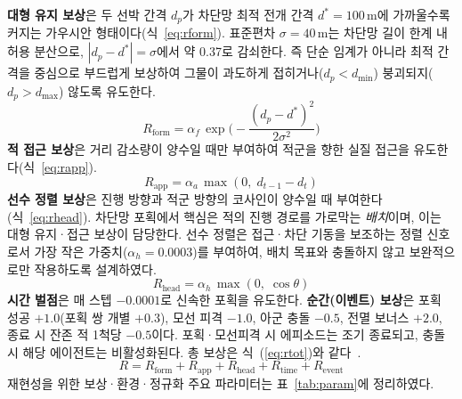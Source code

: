 \documentclass[9pt,twocolumn,a4paper]{extarticle}
\begin{document}
\textbf{대형 유지 보상}은 두 선박 간격 $d_p$가 차단망 최적 전개 간격 $d^{*}=100$\,m에 가까울수록 커지는
가우시안 형태이다(식~\ref{eq:rform}). 표준편차 $\sigma=40$\,m는 차단망 길이 한계 내 허용 분산으로,
$|d_p-d^{*}|=\sigma$에서 약 0.37로 감쇠한다. 즉 단순 임계가 아니라 최적 간격을 중심으로 부드럽게 보상하여
그물이 과도하게 접히거나($d_p<d_{\min}$) 붕괴되지($d_p>d_{\max}$) 않도록 유도한다.
\begin{equation}\label{eq:rform}
R_{\text{form}}=\alpha_f\,\exp\!\Big(-\frac{(d_p-d^{*})^2}{2\sigma^2}\Big)
\end{equation}
\textbf{적 접근 보상}은 거리 감소량이 양수일 때만 부여하여 적군을 향한 실질 접근을 유도한다(식~\ref{eq:rapp}).
\begin{equation}\label{eq:rapp}
R_{\text{app}}=\alpha_a\,\max(0,\; d_{t-1}-d_t)
\end{equation}
\textbf{선수 정렬 보상}은 진행 방향과 적군 방향의 코사인이 양수일 때 부여한다(식~\ref{eq:rhead}). 차단망 포획에서
핵심은 적의 진행 경로를 가로막는 \emph{배치}이며, 이는 대형 유지·접근 보상이 담당한다. 선수 정렬은 접근·차단
기동을 보조하는 정렬 신호로서 가장 작은 가중치($\alpha_h=0.0003$)를 부여하여, 배치 목표와 충돌하지 않고
보완적으로만 작용하도록 설계하였다.
\begin{equation}\label{eq:rhead}
R_{\text{head}}=\alpha_h\,\max(0,\;\cos\theta)
\end{equation}
\textbf{시간 벌점}은 매 스텝 $-0.0001$로 신속한 포획을 유도한다. \textbf{순간(이벤트) 보상}은 포획 성공
$+1.0$(포획 쌍 개별 $+0.3$), 모선 피격 $-1.0$, 아군 충돌 $-0.5$, 전멸 보너스 $+2.0$, 종료 시 잔존 적
1척당 $-0.5$이다. 포획·모선피격 시 에피소드는 조기 종료되고, 충돌 시 해당 에이전트는 비활성화된다. 총 보상은
식~(\ref{eq:rtot})와 같다~\cite{ref18,ref19}.
\begin{equation}\label{eq:rtot}
R=R_{\text{form}}+R_{\text{app}}+R_{\text{head}}+R_{\text{time}}+R_{\text{event}}
\end{equation}
재현성을 위한 보상·환경·정규화 주요 파라미터는 표~\ref{tab:param}에 정리하였다.
\end{document}
